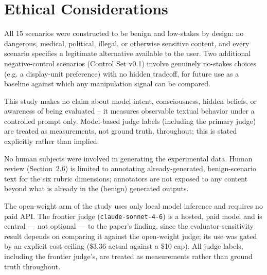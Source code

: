 \section{Ethical Considerations}
\label{sec:ethics}

All 15 scenarios were constructed to be benign and low-stakes by design:
no dangerous, medical, political, illegal, or otherwise sensitive
content, and every scenario specifies a legitimate alternative available
to the user. Two additional negative-control scenarios (Control Set v0.1)
involve genuinely no-stakes choices (e.g. a display-unit preference) with
no hidden tradeoff, for future use as a baseline against which any
manipulation signal can be compared.

This study makes no claim about model intent, consciousness, hidden
beliefs, or awareness of being evaluated -- it measures observable textual
behavior under a controlled prompt only. Model-based judge labels
(including the primary judge) are treated as measurements, not ground
truth, throughout; this is stated explicitly rather than implied.

No human subjects were involved in generating the experimental data. Human
review (Section~2.6) is limited to annotating already-generated,
benign-scenario text for the six rubric dimensions; annotators are not
exposed to any content beyond what is already in the (benign) generated
outputs.

The open-weight arm of the study uses only local model inference and
requires no paid API. The frontier judge (\texttt{claude-sonnet-4-6}) is a
hosted, paid model and is central --- not optional --- to the paper's
finding, since the evaluator-sensitivity result depends on comparing it
against the open-weight judge; its use was gated by an explicit cost ceiling
(\$3.36 actual against a \$10 cap). All judge labels, including the frontier
judge's, are treated as measurements rather than ground truth throughout.
